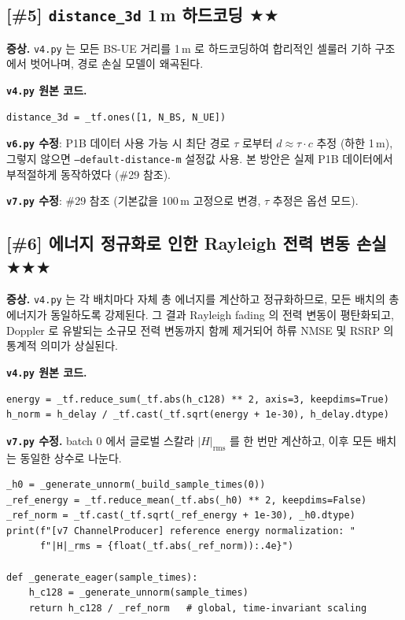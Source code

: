 \documentclass[11pt,a4paper]{article}
\newcommand{\stwo}{\textcolor{starcolor}{$\bigstar\bigstar$}}
\newcommand{\sthree}{\textcolor{starcolor}{$\bigstar\bigstar\bigstar$}}
\newcommand{\vfour}{\texttt{v4.py}}
\newcommand{\vsix}{\texttt{v6.py}}
\newcommand{\vseven}{\texttt{v7.py}}
\newcommand{\bugitem}[3]{%
  \subsection{[\##1] #2 \hfill #3}%
  \vspace{-0.5em}%
}
\begin{document}
\bugitem{5}{\texttt{distance\_3d} 1\,m 하드코딩}{\stwo}

\textbf{증상.} \vfour{} 는 모든 BS-UE 거리를 1\,m 로 하드코딩하여 합리적인
셀룰러 기하 구조에서 벗어나며, 경로 손실 모델이 왜곡된다.

\textbf{\vfour{} 원본 코드.}
\begin{lstlisting}[caption={v4.py: line 1782}]
distance_3d = _tf.ones([1, N_BS, N_UE])
\end{lstlisting}

\textbf{\vsix{} 수정}: P1B 데이터 사용 가능 시 최단 경로 $\tau$ 로부터
$d \approx \tau \cdot c$ 추정 (하한 1\,m), 그렇지 않으면
\texttt{--default-distance-m} 설정값 사용. 본 방안은 실제 P1B 데이터에서
부적절하게 동작하였다 (\#29 참조).

\textbf{\vseven{} 수정}: \#29 참조 (기본값을 100\,m 고정으로 변경,
$\tau$ 추정은 옵션 모드).

\bugitem{6}{에너지 정규화로 인한 Rayleigh 전력 변동 손실}{\sthree}

\textbf{증상.} \vfour{} 는 각 배치마다 자체 총 에너지를 계산하고
정규화하므로, 모든 배치의 총 에너지가 동일하도록 강제된다. 그 결과
Rayleigh fading 의 전력 변동이 평탄화되고, Doppler 로 유발되는 소규모
전력 변동까지 함께 제거되어 하류 NMSE 및 RSRP 의 통계적 의미가 상실된다.

\textbf{\vfour{} 원본 코드.}
\begin{lstlisting}[caption={v4.py: lines 1834--1835}]
energy = _tf.reduce_sum(_tf.abs(h_c128) ** 2, axis=3, keepdims=True)
h_norm = h_delay / _tf.cast(_tf.sqrt(energy + 1e-30), h_delay.dtype)
\end{lstlisting}

\textbf{\vseven{} 수정.} batch 0 에서 글로벌 스칼라 $|H|_{\text{rms}}$ 를
한 번만 계산하고, 이후 모든 배치는 동일한 상수로 나눈다.
\begin{lstlisting}[caption={v7.py: lines 2117--2125}]
_h0 = _generate_unnorm(_build_sample_times(0))
_ref_energy = _tf.reduce_mean(_tf.abs(_h0) ** 2, keepdims=False)
_ref_norm = _tf.cast(_tf.sqrt(_ref_energy + 1e-30), _h0.dtype)
print(f"[v7 ChannelProducer] reference energy normalization: "
      f"|H|_rms = {float(_tf.abs(_ref_norm)):.4e}")

def _generate_eager(sample_times):
    h_c128 = _generate_unnorm(sample_times)
    return h_c128 / _ref_norm   # global, time-invariant scaling
\end{lstlisting}
\end{document}
